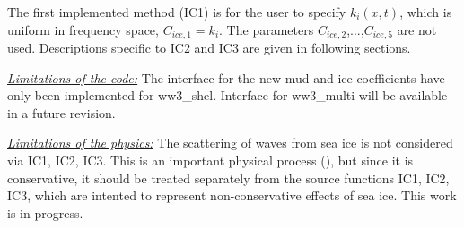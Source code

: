 The first implemented method (IC1) is for the user to specify 
${k_i(x,t)}$, which is uniform in frequency
space, ${C_{ice,1}}={k_i}$. The parameters ${C_{ice,2}}$,...,${C_{ice,5}}$ are not used. Descriptions specific to IC2 and IC3 are given in following sections.

\textrm{\textit{\underline{Limitations of the code:}}} The interface for the new mud and ice coefficients have only been implemented for {\file ww3\_shel}. Interface for {\file ww3\_multi} will be available in a future revision. 

\textrm{\textit{\underline{Limitations of the physics:}}} The scattering of waves from sea ice is not considered via IC1, IC2, IC3. This is an important physical process (\cite{art:Wad75}), but since it is conservative, it should be treated separately from the source functions IC1, IC2, IC3, which are intented to represent non-conservative effects of sea ice. This work is in progress.
